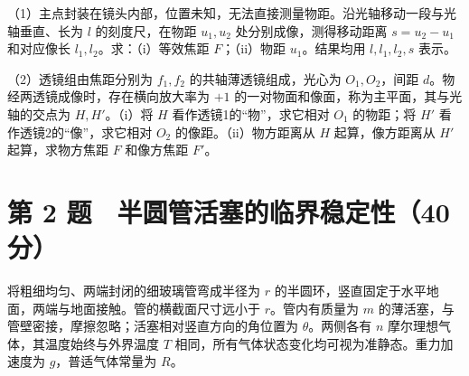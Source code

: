 \documentclass[12pt,a4paper,fontset=fandol]{ctexart}
\begin{document}
（1）主点封装在镜头内部，位置未知，无法直接测量物距。沿光轴移动一段与光轴垂直、长为
\(l\) 的刻度尺，在物距 \(u_1,u_2\) 处分别成像，测得移动距离
\(s=u_2-u_1\) 和对应像长 \(l_1,l_2\)。求：（i）等效焦距
\(F\)；（ii）物距 \(u_1\)。结果均用 \(l,l_1,l_2,s\) 表示。

（2）透镜组由焦距分别为 \(f_1,f_2\) 的共轴薄透镜组成，光心为
\(O_1,O_2\)，间距 \(d\)。物经两透镜成像时，存在横向放大率为 \(+1\)
的一对物面和像面，称为主平面，其与光轴的交点为 \(H,H'\)。（i）将 \(H\)
看作透镜1的``物''，求它相对 \(O_1\) 的物距；将 \(H'\)
看作透镜2的``像''，求它相对 \(O_2\) 的像距。（ii）物方距离从 \(H\)
起算，像方距离从 \(H'\) 起算，求物方焦距 \(F\) 和像方焦距 \(F'\)。

\clearpage

\section{第 2
题　半圆管活塞的临界稳定性（40分）}\label{ux7b2c-2-ux9898-ux534aux5706ux7ba1ux6d3bux585eux7684ux4e34ux754cux7a33ux5b9aux602740ux5206}

将粗细均匀、两端封闭的细玻璃管弯成半径为 \(r\)
的半圆环，竖直固定于水平地面，两端与地面接触。管的横截面尺寸远小于
\(r\)。管内有质量为 \(m\)
的薄活塞，与管壁密接，摩擦忽略；活塞相对竖直方向的角位置为
\(\theta\)。两侧各有 \(n\) 摩尔理想气体，其温度始终与外界温度 \(T\)
相同，所有气体状态变化均可视为准静态。重力加速度为 \(g\)，普适气体常量为
\(R\)。

\begin{center}
\begin{minipage}{\linewidth}
\centering\begingroup{}
\ifdim\wd\diagrambox>.88\linewidth
\sbox{\diagrambox}{\resizebox{.88\linewidth}{!}{\usebox{\diagrambox}}}\fi
\ifdim\ht\diagrambox>.38\textheight
\resizebox{!}{.38\textheight}{\usebox{\diagrambox}}
\else\usebox{\diagrambox}\fi
\par{}\endgroup\end{minipage}\end{center}
\end{document}
